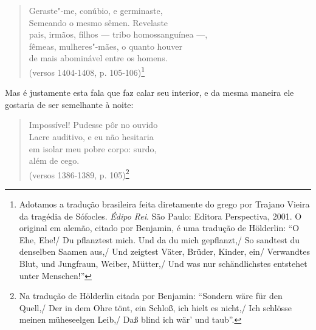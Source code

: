 \begin{verse}
Geraste"-me, conúbio, e germinaste,\\
Semeando o mesmo sêmen. Revelaste\\
pais, irmãos, filhos \qb{}--- tribo homossanguínea ---,\\
fêmeas, mulheres"-mães, o quanto houver\\
de mais abominável entre os homens.\\
(versos 1404-1408, p. 105-106)\footnote{Adotamos a tradução
  brasileira feita diretamente do grego por Trajano Vieira da tragédia
  de Sófocles. \emph{Édipo Rei}. São Paulo: Editora Perspectiva, 2001. O
  original em alemão, citado por Benjamin, é uma tradução de Hölderlin:
  ``O Ehe, Ehe!/ Du pflanztest mich. Und da du mich gepflanzt,/
  So sandtest du denselben Saamen aus,/
  Und zeigtest Väter, Brüder, Kinder, ein/
  Verwandtes Blut, und Jungfraun, Weiber, Mütter,/
  Und was nur schändlichstes entstehet unter Menschen!'' \versal{[N. T.]}}
\end{verse}

Mas é justamente esta fala que faz calar seu interior, e da mesma maneira ele
gostaria de ser semelhante à noite:

\begin{verse}
Impossível! Pudesse pôr no ouvido\\
Lacre auditivo, e eu não hesitaria\\
em isolar meu pobre corpo: surdo,\\
além de cego.\\
(versos 1386-1389, p. 105)\footnote{Na tradução de Hölderlin
  citada por Benjamin: ``Sondern wäre für den Quell,/ Der in dem Ohre
  tönt, ein Schloß, ich hielt es nicht,/ Ich schlösse meinen müheseelgen
  Leib,/ Daß blind ich wär' und taub''. \versal{[N. T.]}}
\end{verse}

